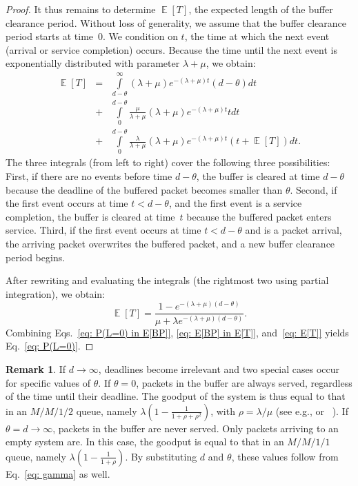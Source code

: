 \documentclass[preprint,12pt]{elsarticle}
\theoremstyle{definition}
\newtheorem{rem}{Remark}
\theoremstyle{plain}
\theoremstyle{remark}
\newcommand{\e}{e}
\DeclareMathOperator{\E}{\mathbb{E}}
\begin{document}
\begin{proof}
  It thus remains to determine $\E[T]$, the expected length of the buffer clearance period. Without loss of generality, we assume that the buffer clearance period starts at time~0. We condition on $t$, the time at which the next event (arrival or service completion) occurs. Because the time until the next event is exponentially distributed with parameter $\lambda + \mu$, we obtain:
  \begin{eqnarray*}
    \E[T] &=& \int\limits_{d-\theta}^{\infty} (\lambda+\mu)\e^{-(\lambda+\mu)t}(d-\theta) dt \\
    &+& \int\limits_0^{d-\theta} \frac{\mu}{\lambda+\mu}(\lambda+\mu)\e^{-(\lambda+\mu)t} t dt \\
    &+&\int\limits_0^{d-\theta} \frac{\lambda}{\lambda+\mu}(\lambda+\mu)\e^{-(\lambda+\mu)t}(t+\E[T])dt.
  \end{eqnarray*}
  The three integrals (from left to right) cover the following three possibilities: First, if there are no events before time $d-\theta$, the buffer is cleared at time $d-\theta$ because the deadline of the buffered packet becomes smaller than $\theta$. Second, if the first event occurs at time $t < d-\theta$, and the first event is a service completion, the buffer is cleared at time~$t$ because the buffered packet enters service. Third, if the first event occurs at time $t<d-\theta$ and is a packet arrival, the arriving packet overwrites the buffered packet, and a new buffer clearance period begins.

  After rewriting and evaluating the integrals (the rightmost two using partial integration), we obtain:
  \begin{equation}\label{eq: E[T]}
    \E[T] = \frac{1-\e^{-(\lambda+\mu)(d-\theta)}}{\mu + \lambda \e^{-(\lambda+\mu)(d-\theta)}}.
  \end{equation}
  Combining Eqs.~\eqref{eq: P(L=0) in E[BP]}, \eqref{eq: E[BP] in E[T]}, and~\eqref{eq: E[T]} yields Eq.~\eqref{eq: P(L=0)}.
\end{proof}


\begin{rem}
If $d\to \infty$, deadlines become irrelevant and two special cases occur for specific values of $\theta$. If $\theta=0$, packets in the buffer are always served, regardless of the time until their deadline. The goodput of the system is thus equal to that in an $M/M/1/2$ queue, namely $\lambda(1-\frac{1}{1+\rho+\rho^2})$, with $\rho = \lambda/\mu$ (see e.g., \cite[Section~5.7]{wolff_intro_to_queueing_theory} or~ \cite[Section~3.6]{Kleinrock_queueing_systems_vol1}). If $\theta=d \to \infty$, packets in the buffer are never served. Only packets arriving to an empty system are. In this case, the goodput is equal to that in an $M/M/1/1$ queue, namely $\lambda(1-\frac{1}{1+\rho})$. By substituting $d$ and $\theta$, these values follow from Eq.~\eqref{eq: gamma} as well.
\end{rem}
\end{document}
